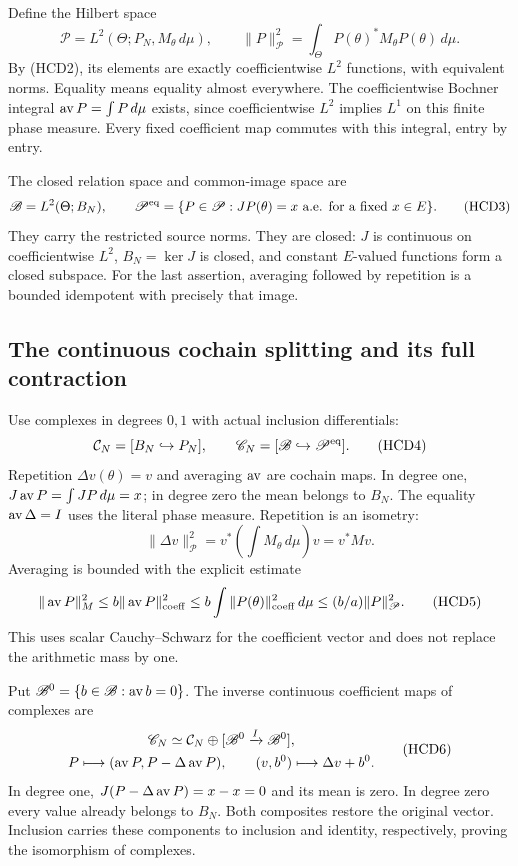 \documentclass[11pt,a4paper]{article}
\theoremstyle{definition}
\begin{document}
Define the Hilbert space
\[
 \mathscr P=L^2(\Theta;P_N,M_\theta\,d\mu),\qquad
 \|P\|_{\mathscr P}^2=\int_\Theta P(\theta)^*M_\theta
 P(\theta)\,d\mu.
\]
By (HCD2), its elements are exactly coefficientwise $L^2$
functions, with equivalent norms. Equality means equality
almost everywhere. The coefficientwise Bochner integral
$\operatorname{av} P=\int P\,d\mu$ exists, since coefficientwise $L^2$
implies $L^1$ on this finite phase measure. Every fixed
coefficient map commutes with this integral, entry by entry.

The closed relation space and common-image space are
\[
 \mathscr B=L^2(\Theta;B_N),\qquad
 \mathscr P^{\rm eq}
 =\{P\in\mathscr P:JP(\theta)=x\text{ a.e. for a fixed }x\in E\}.
 \tag{HCD3}
\]
They carry the restricted source norms. They are closed:
$J$ is continuous on coefficientwise $L^2$, $B_N=\ker J$
is closed, and constant $E$-valued functions form a closed
subspace. For the last assertion, averaging followed by
repetition is a bounded idempotent with precisely that image.

\subsection{The continuous cochain splitting and its full contraction}

Use complexes in degrees $0,1$ with actual inclusion differentials:
\[
 \mathcal C_N=[B_N\hookrightarrow P_N],\qquad
 \mathscr C_N=[\mathscr B\hookrightarrow\mathscr P^{\rm eq}].
 \tag{HCD4}
\]
Repetition $\Delta v(\theta)=v$ and averaging $\operatorname{av}$ are cochain
maps. In degree one, $J\operatorname{av} P=\int JP\,d\mu=x$; in degree
zero the mean belongs to $B_N$. The equality $\operatorname{av}\Delta=I$
uses the literal phase measure. Repetition is an isometry:
\[
 \|\Delta v\|_{\mathscr P}^2
 =v^*\left(\int M_\theta\,d\mu\right)v=v^*Mv.
\]
Averaging is bounded with the explicit estimate
\[
 \|\operatorname{av} P\|_M^2
 \le b\|\operatorname{av} P\|_{\rm coeff}^2
 \le b\int\|P(\theta)\|_{\rm coeff}^2\,d\mu
 \le (b/a)\|P\|_{\mathscr P}^2.
 \tag{HCD5}
\]
This uses scalar Cauchy--Schwarz for the coefficient vector
and does not replace the arithmetic mass by one.

Put $\mathscr B^0=\{b\in\mathscr B:\operatorname{av} b=0\}$. The inverse
continuous coefficient maps of complexes are
\[
 \begin{gathered}
 \mathscr C_N\simeq
 \mathcal C_N\oplus[\mathscr B^0\xrightarrow{I}\mathscr B^0],\\
 P\longmapsto(\operatorname{av} P,P-\Delta\operatorname{av} P),\qquad
 (v,b^0)\longmapsto\Delta v+b^0.
 \end{gathered}
 \tag{HCD6}
\]
In degree one, $J(P-\Delta\operatorname{av} P)=x-x=0$ and its mean is
zero. In degree zero every value already belongs to $B_N$.
Both composites restore the original vector. Inclusion
carries these components to inclusion and identity,
respectively, proving the isomorphism of complexes.
\end{document}
